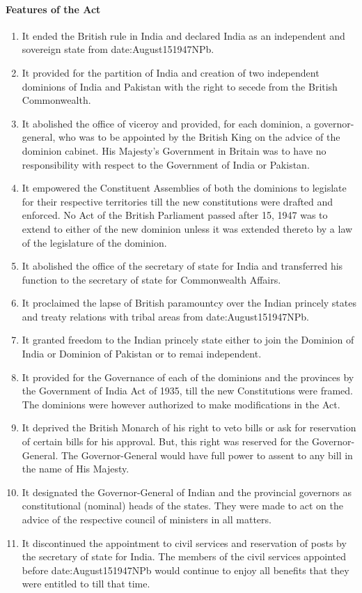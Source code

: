 \paragraph{Features of the Act}
\begin{enumerate}
  \item It ended the British rule in India and declared India as an independent and sovereign state from \gls{date:August151947NPb}.
  \item It provided for the partition of India and creation of two independent dominions of India and Pakistan with the right to secede from the British Commonwealth.
  \item It abolished the office of viceroy and provided, for each dominion, a governor-general, who was to be appointed by the British King on the advice of the dominion cabinet. His Majesty's Government in Britain was to have no responsibility with respect to the Government of India or Pakistan.
  \item It empowered the Constituent Assemblies of both the dominions to legislate for their respective territories till the new constitutions were drafted and enforced. No Act of the British Parliament passed after 15, 1947 was to extend to either of the new dominion unless it was extended thereto by a law of the legislature of the dominion.
  \item It abolished the office of the secretary of state for India and transferred his function to the secretary of state for Commonwealth Affairs.
  \item It proclaimed the lapse of British paramountcy over the Indian princely states and treaty relations with tribal areas from \gls{date:August151947NPb}.
  \item It granted freedom to the Indian princely state either to join the Dominion of India or Dominion of Pakistan or to remai independent.
  \item It provided for the Governance of each of the dominions and the provinces by the Government of India Act of 1935, till the new Constitutions were framed. The dominions were however authorized to make modifications in the Act.
  \item It deprived the British Monarch of his right to veto bills or ask for reservation of certain bills for his approval. But, this right was reserved for the Governor-General. The Governor-General would have full power to assent to any bill in the name of His Majesty.
  \item It designated the Governor-General of Indian and the provincial governors as constitutional (nominal) heads of the states. They were made to act on the advice of the respective council of ministers in all matters.
  \item It discontinued the appointment to civil services and reservation of posts by the secretary of state for India. The members of the civil services appointed before \gls{date:August151947NPb} would continue to enjoy all benefits that they were entitled to till that time.
\end{enumerate}

